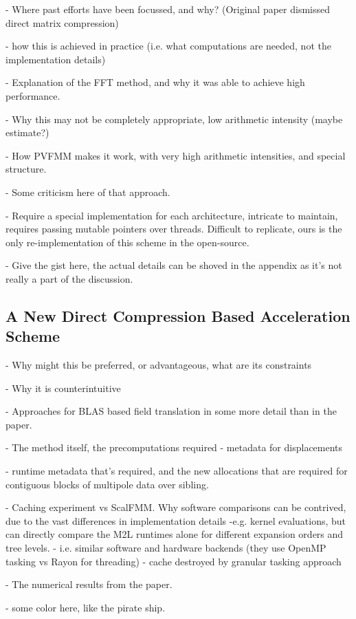 - Where past efforts have been focussed, and why? (Original paper dismissed direct matrix compression)

- how this is achieved in practice (i.e. what computations are needed, not the implementation details)

- Explanation of the FFT method, and why it was able to achieve high performance.

- Why this may not be completely appropriate, low arithmetic intensity (maybe estimate?)

- How PVFMM makes it work, with very high arithmetic intensities, and special structure.

- Some criticism here of that approach.

- Require a special implementation for each architecture, intricate to maintain, requires passing mutable pointers over threads. Difficult to replicate, ours is the only re-implementation of this scheme in the open-source.

- Give the gist here, the actual details can be shoved in the appendix as it's not really a part of the discussion.

\subsection{A New Direct Compression Based Acceleration Scheme}

- Why might this be preferred, or advantageous, what are its constraints

- Why it is counterintuitive

- Approaches for BLAS based field translation in some more detail than in the paper.

- The method itself, the precomputations required - metadata for displacements

- runtime metadata that's required, and the new allocations that are required for contiguous blocks of multipole data over sibling.

- Caching experiment vs ScalFMM. Why software comparisons can be contrived, due to the vast differences in implementation details -e.g. kernel evaluations, but can directly compare the M2L runtimes alone for different expansion orders and tree levels.
    - i.e. similar software and hardware backends (they use OpenMP tasking vs Rayon for threading)
    - cache destroyed by granular tasking approach

- The numerical results from the paper.

- some color here, like the pirate ship.

